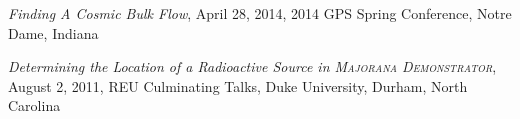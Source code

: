 \documentclass[margin]{res}
\begin{document}
\begin{resume}
\hangindent=15pt 
{\sl Finding A Cosmic Bulk Flow}, April 28, 2014, 2014 GPS Spring Conference, Notre Dame, Indiana
\vspace{-12pt}

\hangindent=15pt 
{\sl Determining the Location of a Radioactive Source in \textsc{Majorana Demonstrator}}, August 2, 2011, REU Culminating Talks, Duke University, Durham, North Carolina

\begin{comment}
{\sl Searching For a Cosmic-scale Dark Flow} \hfill {\bf November 20, 2015}\\
2015 APS Prairie Section Meeting, Notre Dame

{\sl Finding A Cosmic Bulk Flow} \hfill {\bf April 28, 2014}\\
2014 GPS Spring Conference, Notre Dame 

{\sl Determining the Location of a Radioactive Source in \textsc{Majorana}} \hfill {\bf August 2, 2011} \\
{\sl\textsc{Demonstrator}} \\
REU Culminating Talks,
Duke University %
\end{comment}








\end{resume}
\end{document}
